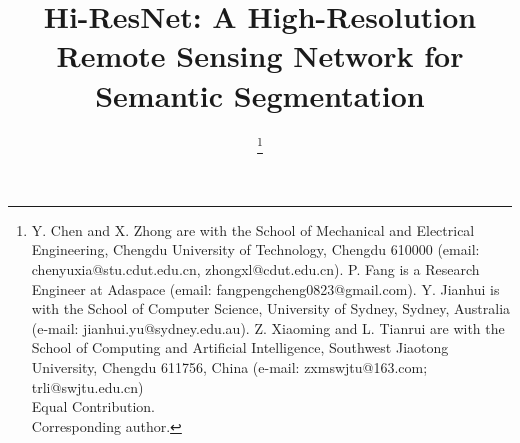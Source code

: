 \documentclass[journal]{IEEEtran}
\begin{document}
\title{Hi-ResNet: A High-Resolution Remote Sensing Network for Semantic Segmentation}

\author{


\thanks{Y. Chen and X. Zhong are with the School of Mechanical and Electrical Engineering, Chengdu University of Technology, Chengdu 610000 (email:  chenyuxia@stu.cdut.edu.cn, zhongxl@cdut.edu.cn).
P. Fang is a Research Engineer at Adaspace (email: fangpengcheng0823@gmail.com).
Y. Jianhui is with the School of Computer Science, University of Sydney, Sydney, Australia (e-mail: jianhui.yu@sydney.edu.au).
Z. Xiaoming and L. Tianrui are with the School of Computing and Artificial Intelligence, Southwest Jiaotong University, Chengdu 611756, China (e-mail:  zxmswjtu@163.com; trli@swjtu.edu.cn)
\\
 Equal Contribution.
\\
 Corresponding author.
}}


\maketitle
\end{document}
